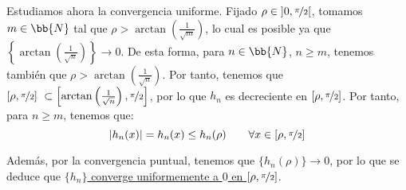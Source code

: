 \begin{ejercicio}
    Estudiamos ahora la convergencia uniforme. Fijado $\rho \in \left]0,\nicefrac{\pi}{2}\right[$,
    tomamos $m\in \bb{N}$ tal que $\rho > \arctan\left(\frac{1}{\sqrt{m}}\right)$, lo cual es posible ya que
    $\left\{\arctan\left(\frac{1}{\sqrt{n}}\right)\right\}\to 0$. De esta forma,
    para $n\in \bb{N}$, $n\geq m$, tenemos también que $\rho > \arctan\left(\frac{1}{\sqrt{n}}\right)$. Por tanto,
    tenemos que $[\rho ,\nicefrac{\pi}{2}]~\subset \left[\arctan\left(\frac{1}{\sqrt{n}}\right),\nicefrac{\pi}{2}\right]$,
    por lo que $h_n$ es decreciente en $[\rho,\nicefrac{\pi}{2}]$. Por tanto, para $n\geq m$, tenemos que:
    \begin{equation*}
        |h_n(x)| = h_n(x) \leq h_n(\rho) \qquad \forall x\in [\rho,\nicefrac{\pi}{2}]
    \end{equation*}

    Además, por la convergencia puntual, tenemos que $\{h_n(\rho)\}\to 0$, por lo que se deduce que \ul{$\{h_n\}$ converge uniformemente a $0$ en $[\rho,\nicefrac{\pi}{2}]$}.
\end{ejercicio}



